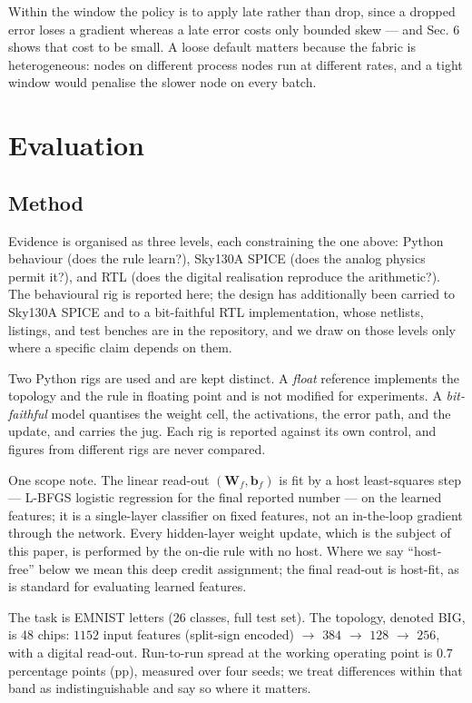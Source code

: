 \documentclass[11pt]{article}
\begin{document}
Within the window the policy is to apply late rather than drop, since a
dropped error loses a gradient whereas a late error costs only bounded
skew --- and Sec. 6 shows that cost to be small. A loose default matters
because the fabric is heterogeneous: nodes on different process nodes
run at different rates, and a tight window would penalise the slower
node on every batch.

\hypertarget{sec:results}{%
\section{Evaluation}\label{sec:results}}

\hypertarget{method}{%
\subsection{Method}\label{method}}

Evidence is organised as three levels, each constraining the one above:
Python behaviour (does the rule learn?), Sky130A SPICE (does the analog
physics permit it?), and RTL (does the digital realisation reproduce the
arithmetic?). The behavioural rig is reported here; the design has
additionally been carried to Sky130A SPICE and to a bit-faithful RTL
implementation, whose netlists, listings, and test benches are in the
repository, and we draw on those levels only where a specific claim
depends on them.

Two Python rigs are used and are kept distinct. A \emph{float} reference
implements the topology and the rule in floating point and is not
modified for experiments. A \emph{bit-faithful} model quantises the
weight cell, the activations, the error path, and the update, and
carries the jug. Each rig is reported against its own control, and
figures from different rigs are never compared.

One scope note. The linear read-out \((\bm W_f, \bm b_f)\) is fit by a
host least-squares step --- L-BFGS logistic regression for the final
reported number --- on the learned features; it is a single-layer
classifier on fixed features, not an in-the-loop gradient through the
network. Every hidden-layer weight update, which is the subject of this
paper, is performed by the on-die rule with no host. Where we say
``host-free'' below we mean this deep credit assignment; the final
read-out is host-fit, as is standard for evaluating learned features.

The task is EMNIST letters \cite{cohen2017emnist} (26 classes, full
test set). The topology, denoted BIG, is 48 chips: \(1152\) input
features (split-sign encoded) \(\to\) \(384\) \(\to\) \(128\) \(\to\)
\(256\), with a digital read-out. Run-to-run spread at the working
operating point is \(0.7\) percentage points (pp), measured over four
seeds; we treat differences within that band as indistinguishable and
say so where it matters.
\end{document}
